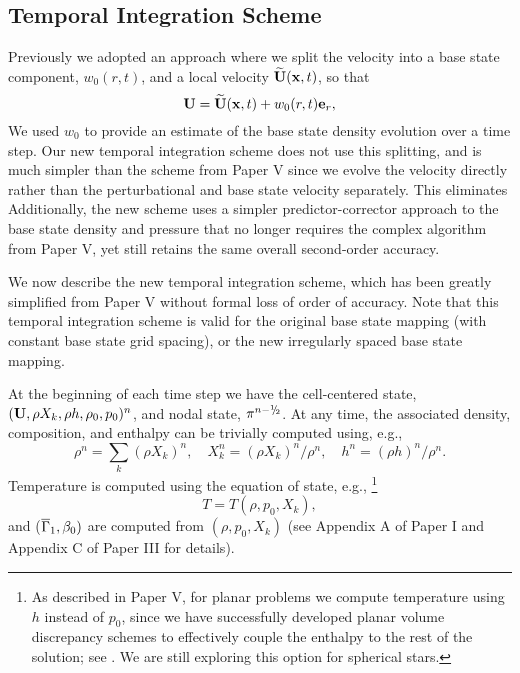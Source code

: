 \subsection{Temporal Integration Scheme}\label{Sec:Temporal Integration Scheme}
Previously we adopted an approach where we split the velocity into a base state component, $w_0(r,t)$, 
and a local velocity $\widetilde{{\bf{U}}}({\bf{x}},t)$, so that
\begin{equation}
\Ub = \Ubt(\xb,t) + w_0(r,t)\eb_r,
\end{equation}
We used $w_0$ to provide an estimate of the base state density evolution over a time step.
Our new temporal integration scheme does not use this splitting, and is much simpler than the scheme from Paper V since we evolve the velocity directly rather than the perturbational and base state velocity separately.  This eliminates
Additionally, the new scheme uses a simpler predictor-corrector approach to the base state density and pressure that no longer requires the complex algorithm from Paper V, yet still retains the same overall second-order accuracy.

We now describe the new temporal integration scheme, which has been greatly simplified from Paper V without formal loss of order of accuracy.
Note that this temporal integration scheme is valid for the original base state mapping (with constant base state grid spacing), or the new irregularly spaced base state mapping.

At the beginning of each time step we have the cell-centered state,
$({\bf{U}},\rho X_k,\rho h,\rho_0,p_0)^n$, and nodal state, $\pi^{n-\myhalf}$.
At any time, the associated density, composition, and enthalpy can be trivially computed using, e.g.,
\begin{equation}
\rho^n = \sum_k(\rho X_k)^n, \quad
X_k^n = (\rho X_k)^n / \rho^n, \quad
h^n = (\rho h)^n / \rho^n.
\end{equation}
Temperature is computed using the equation of state, e.g.,
\footnote{As described in Paper V, for planar problems we compute temperature using $h$ instead of $p_0$, since we have successfully developed planar volume discrepancy schemes to effectively couple the enthalpy to the rest of the solution; see \cite{XRB_I}.  We are still exploring this option for spherical stars.}
\begin{equation}
T = T(\rho,p_0,X_k),
\end{equation}
and ($\overline{\Gamma}_1,\beta_0)$ are computed from $(\rho,p_0,X_k)$ (see Appendix A of Paper I and Appendix C of Paper III for details).

